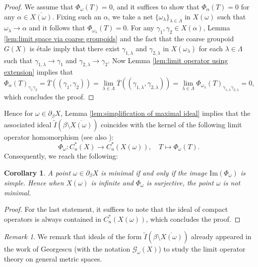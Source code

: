 \documentclass[12pt, a4paper]{amsart}
\numberwithin{equation}{section}
\newtheorem{cor}[thm]{Corollary}
\theoremstyle{definition}
\theoremstyle{remark}
\newtheorem{rem}[thm]{Remark}
\begin{document}
\begin{proof}
We assume that $\Phi_\omega(T)=0$, and it suffices to show that $\Phi_\alpha(T)=0$ for any $\alpha \in \overline{X(\omega)}$. Fixing such an $\alpha$, we take a net $\{\omega_\lambda\}_{\lambda \in \Lambda}$ in $X(\omega)$ such that $\omega_\lambda \to \alpha$ and it follows that $\Phi_{\omega_\lambda}(T)=0$. For any $\gamma_1, \gamma_2 \in X(\alpha)$, Lemma \ref{lem:limit space via coarse groupoids} and the fact that the coarse groupoid $G(X)$ is \'{e}tale imply that there exist $\gamma_{1,\lambda}$ and $\gamma_{2,\lambda}$ in $X(\omega_\lambda)$ for each $\lambda \in \Lambda$ such that $\gamma_{1,\lambda} \to \gamma_1$ and $\gamma_{2,\lambda} \to \gamma_2$. Now Lemma \ref{lem:limit operator using extension} implies that
\[
\Phi_\alpha(T)_{\gamma_1\gamma_2} = \overline{T}((\gamma_1,\gamma_2)) = \lim_{\lambda \in \Lambda} \overline{T}((\gamma_{1,\lambda},\gamma_{2,\lambda})) = \lim_{\lambda \in \Lambda} \Phi_{\omega_\lambda}(T)_{\gamma_{1,\lambda}\gamma_{2,\lambda}} = 0,
\]
which concludes the proof.
\end{proof}


Hence for $\omega \in \partial_\beta X$, Lemma \ref{lem:simplification of maximal ideal} implies that the associated ideal $\tilde{I}(\beta  \setminus \overline{X(\omega)})$ coincides with the kernel of the following limit operator homomorphism (see also \cite[Theorem 4.10]{SW17}):
\begin{equation}\label{EQ:limit op homo}
\Phi_\omega: C^*_u(X) \longrightarrow C^*_u(X(\omega)), \quad T \mapsto \Phi_\omega(T).
\end{equation}
Consequently, we reach the following:

\begin{cor}\label{cor:simple char for max ideal2}
A point $\omega \in \partial_\beta X$ is minimal \emph{if and only if} the image $\mathrm{Im}(\Phi_\omega)$ is simple. Hence when $X(\omega)$ is infinite and $\Phi_\omega$ is surjective, the point $\omega$ is \emph{not} minimal.
\end{cor}

\begin{proof}
For the last statement, it suffices to note that the ideal of compact operators is always contained in $C^*_u(X(\omega))$, which concludes the proof.
\end{proof}

\begin{rem}
We remark that ideals of the form $\tilde{I}(\beta  \setminus \overline{X(\omega)})$ already appeared in the work of Georgescu \cite{Geo11} (with the notation $\mathscr{G}_\omega(X)$) to study the limit operator theory on general metric spaces.
\end{rem}
\end{document}
